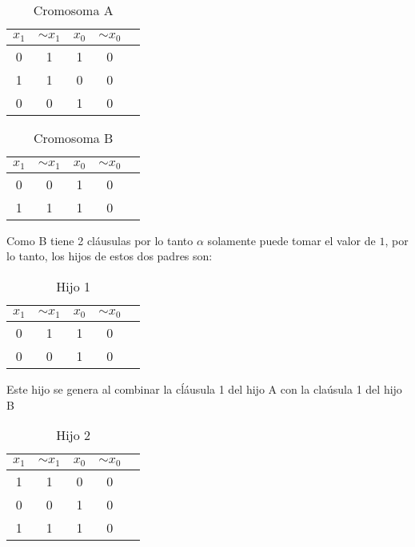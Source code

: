\documentclass[a4paper]{article}
\begin{document}
\begin{table}[H]
	\centering
	\caption{Cromosoma A}
	\begin{tabular}{|c | c | c|  c|  c|}
		\hline
		$x_1$ & $ \sim{x_1}$ & $x_0$ & $ \sim{x_0}$\\
		\hline
		0 & 1& 1 & 0\\
		\hline
		1 & 1& 0 & 0\\
		\hline
		0 & 0& 1 & 0\\
		\hline
	\end{tabular}
\end{table}

\begin{table}[H]
	\centering
	\caption{Cromosoma B}
	\begin{tabular}{|c | c | c|  c|  c|}
		\hline
		$x_1$ & $ \sim{x_1}$ & $x_0$ & $ \sim{x_0}$\\
		\hline
		0 & 0& 1 & 0\\
		\hline
		1 & 1& 1 & 0\\
		\hline
	\end{tabular}
\end{table}

Como B tiene 2 cláusulas por lo tanto $\alpha$ solamente puede tomar el valor de $1$, por lo tanto, los hijos de estos dos padres son:

\begin{table}[H]
	\centering
	\caption{Hijo 1}
	\begin{tabular}{|c | c | c|  c|  c|}
		\hline
		$x_1$ & $ \sim{x_1}$ & $x_0$ & $ \sim{x_0}$\\
		\hline
		0 & 1& 1 & 0\\
		\hline
		0 & 0& 1 & 0\\
		\hline
	\end{tabular}
\end{table}

Este hijo se genera al combinar la cĺáusula 1 del hijo A con la claúsula 1 del hijo B

\begin{table}[H]
	\centering
	\caption{Hijo 2}
	\begin{tabular}{|c | c | c|  c|  c|}
		\hline
		$x_1$ & $ \sim{x_1}$ & $x_0$ & $ \sim{x_0}$\\
		\hline
		1 & 1& 0 & 0\\
		\hline
		0 & 0& 1 & 0\\
		\hline
		1 & 1& 1 & 0\\
		\hline
	\end{tabular}
\end{table}
\end{document}
